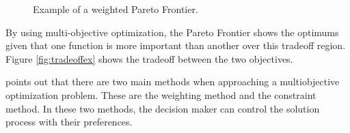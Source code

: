 \begin{figure}%
    \centering
    \label{visualex}
    \qquad
    \caption{Example of a weighted Pareto Frontier.}%
\end{figure}

By using multi-objective optimization, the Pareto Frontier shows the optimums given that one function is more important than another over this tradeoff region. Figure \ref{fig:tradeoffex} shows the tradeoff between the two objectives.


\par
\cite{MultOptCS} points out that there are two main methods when approaching a multiobjective optimization problem. These are the weighting method and the constraint method. In these two methods, the decision maker can control the solution process with their preferences.\par
